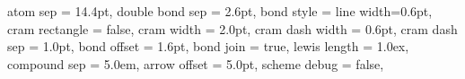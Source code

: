 \nobond{-[,0.2,,,draw=none]}
\def\hammond{\text{\textit{\ddag}}}
\def\rotate{0}
\newcommand{\setpolymerdelim}[2]
{%
  \def\delimleft{#1}%
  \def\delimright{#2}%
}
\setpolymerdelim[]
\newcommand{\reaction}[2]{\arrow{->[\tiny\begin{tabular}{@{}l@{\,}l@{}}#1\end{tabular}][\tiny\begin{tabular}{@{}l@{\,}l@{}}#2\end{tabular}]}}

\let\@chemfig=\chemfig
\let\@chemmove=\chemmove
\renewcommand{\chemfig}[1]{{\@ResetSymbols\@chemfig{#1}}}
\renewcommand{\chemmove}[1]{{\@ResetSymbols\@chemmove{#1}}}

\def\@WrapChemSide{o}
\def\@WrappedOrScheme{wrapped}
\def\enableWrapped{\def\@WrappedOrScheme{wrapped}}
\def\disableWrapped{\def\@WrappedOrScheme{scheme}}
\newcommand{\initAngle}[2]{[:#2]}
\def\MayHorizontalChem{\quad}
\def\@WrappendEnvironment{\renewcommand{\initAngle}[2]{[:##1]}\def\MayHorizontalChem{\arrow{0}[-90,0.1]}}
\def\@Cheme@DefaultScale{1.5}
\newcommand{\chemeDefaultScale}[1][1.5]{\def\@Cheme@DefaultScale{#1}}

\nobond{[,0.2,,,draw=none]}
\newcommand{\NumAtom}[2]{}
\newcommand{\numAtom}[1]{\NumAtom{,0.4}{#1}}
\newcommand{\numAtomWith}[2]{\NumAtom{::#1,0.4}{#2}}
\def\numAtoms{\renewcommand{\NumAtom}[2]{-[##1,,,draw=none]{##2}}}

\setchemfig
{
  atom sep                              =   14.4pt,
  double bond sep                       =    2.6pt,
  bond style                            =   {line width=0.6pt},
  cram rectangle                        =   false,
  cram width                            =    2.0pt,
  cram dash width                       =    0.6pt,
  cram dash sep                         =    1.0pt,
  bond offset                           =    1.6pt,
  bond join                             =   true,
  lewis length                          =    1.0ex,
  compound sep                          =    5.0em,
  arrow offset                          =    5.0pt,
  scheme debug                          =   false,
}
\renewcommand*\printatom[1]{{\scriptsize\ensuremath{\mathsf{#1}}}}


